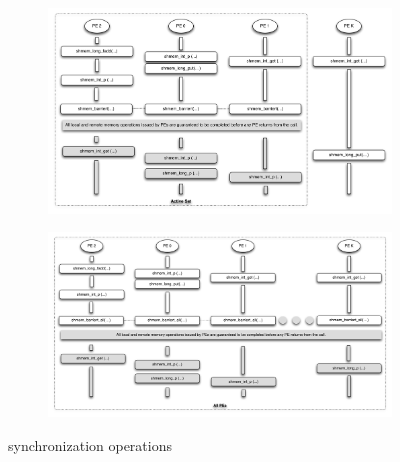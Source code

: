 \begin{figure}
\begin{subfigure}{0.48\textwidth}
                \caption{}
                \label{fig:quiet}
        \end{subfigure}
	    \begin{subfigure}{0.48\textwidth}
		        \includegraphics[width=\textwidth]{diagrams/updated/barrier}
		        \caption{}
		\label{fig:barrier}
	    \end{subfigure}
        \centering
	    \begin{subfigure}{0.48\textwidth}
		        \includegraphics[width=\textwidth]{diagrams/updated/barrierall}
		        \caption{}
		\label{fig:barrierall}
	    \end{subfigure}
        \caption{\openshmem{} synchronization operations}\label{fig:animals}
\end{figure}
